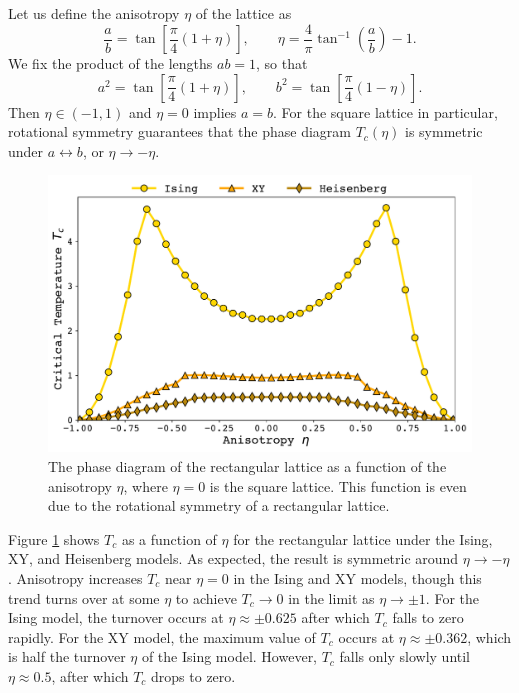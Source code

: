 \documentclass[
  amsmath,
  amssymb,
  aps,
  twocolumn,
  nofootinbib,
  nolongbibliography,
  floatfix,
]{revtex4-2}
\newcommand{\parens}[1]{\left ( #1 \right )}
\newcommand{\brackets}[1]{\left [ #1 \right ]}
\begin{document}
Let us define the anisotropy $\eta$ of the lattice as 
\begin{equation}
  \frac{a}{b} = \tan\brackets{\frac{\pi}{4}\parens{1+\eta}},\qquad \eta = \frac{4}{\pi}\tan^{-1}\parens{\frac{a}{b}}-1.
  \label{eqn:anisotropy}
\end{equation}
We fix the product of the lengths $ab=1$, so that 
\begin{equation}
  a^2 = \tan\brackets{\frac{\pi}{4}\parens{1+\eta}},\qquad b^2 = \tan\brackets{\frac{\pi}{4}\parens{1-\eta}}.
\end{equation}
Then $\eta \in (-1,1)$ and $\eta=0$ implies $a=b$. For the square lattice in particular, rotational symmetry guarantees that the phase diagram $T_c(\eta)$ is symmetric under $a\leftrightarrow b$, or $\eta \rightarrow -\eta$.

\begin{figure}
  \centering
  \includegraphics[width=\linewidth]{../figs/rect-phase.pdf}
  \caption{The phase diagram of the rectangular lattice as a function of the anisotropy $\eta$, where $\eta = 0$ is the square lattice. This function is even due to the rotational symmetry of a rectangular lattice.}
  \label{fig:rect-phase}
\end{figure}

Figure \ref{fig:rect-phase} shows $T_c$ as a function of $\eta$ for the rectangular lattice under the Ising, XY, and Heisenberg models. As expected, the result is symmetric around $\eta \rightarrow -\eta$. Anisotropy increases $T_c$ near $\eta = 0$ in the Ising and XY models, though this trend turns over at some $\eta$ to achieve $T_c\rightarrow 0$ in the limit as $\eta \rightarrow \pm 1$. For the Ising model, the turnover occurs at $\eta\approx \pm 0.625$ after which $T_c$ falls to zero rapidly. For the XY model, the maximum value of $T_c$ occurs at $\eta \approx \pm 0.362$, which is half the turnover $\eta$ of the Ising model. However, $T_c$ falls only slowly until $\eta \approx 0.5$, after which $T_c$ drops to zero.
\end{document}
